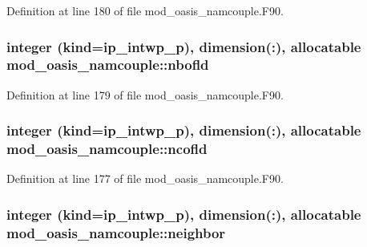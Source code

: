 Definition at line 180 of file mod\+\_\+oasis\+\_\+namcouple.\+F90.

\hypertarget{classmod__oasis__namcouple_a21400200658d24cbf7484b5eb177c911}{
\subsubsection[{nbofld}]{\setlength{\rightskip}{0pt plus 5cm}integer (kind=ip\+\_\+intwp\+\_\+p), dimension(\+:), allocatable mod\+\_\+oasis\+\_\+namcouple\+::nbofld\hspace{0.3cm}{\ttfamily [private]}}}\label{classmod__oasis__namcouple_a21400200658d24cbf7484b5eb177c911}


Definition at line 179 of file mod\+\_\+oasis\+\_\+namcouple.\+F90.

\hypertarget{classmod__oasis__namcouple_a9f8a2a4f44b1c56860fef8df014339d3}{
\subsubsection[{ncofld}]{\setlength{\rightskip}{0pt plus 5cm}integer (kind=ip\+\_\+intwp\+\_\+p), dimension(\+:), allocatable mod\+\_\+oasis\+\_\+namcouple\+::ncofld\hspace{0.3cm}{\ttfamily [private]}}}\label{classmod__oasis__namcouple_a9f8a2a4f44b1c56860fef8df014339d3}


Definition at line 177 of file mod\+\_\+oasis\+\_\+namcouple.\+F90.

\hypertarget{classmod__oasis__namcouple_a298c9165785ae1a41f89597cadd211e7}{
\subsubsection[{neighbor}]{\setlength{\rightskip}{0pt plus 5cm}integer (kind=ip\+\_\+intwp\+\_\+p), dimension(\+:), allocatable mod\+\_\+oasis\+\_\+namcouple\+::neighbor\hspace{0.3cm}{\ttfamily [private]}}}\label{classmod__oasis__namcouple_a298c9165785ae1a41f89597cadd211e7}


